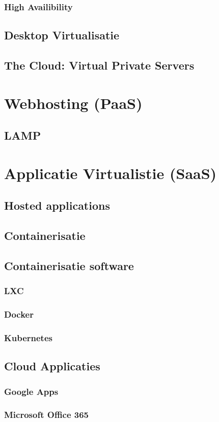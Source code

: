 \documentclass[a4paper,12pt,twoside,openright,titlepage]{book}
\begin{document}
\subsection{High Availibility}
\section{Desktop Virtualisatie}
\section{The Cloud: Virtual Private Servers}

\chapter{Webhosting (PaaS)}
\section{LAMP}

\chapter{Applicatie Virtualistie (SaaS)}

\section{Hosted applications}
\section{Containerisatie}
\section{Containerisatie software}
\subsection{LXC}
\subsection{Docker}
\subsection{Kubernetes}
\section{Cloud Applicaties}
\subsection{Google Apps}
\subsection{Microsoft Office 365}

\printindex
\end{document}
